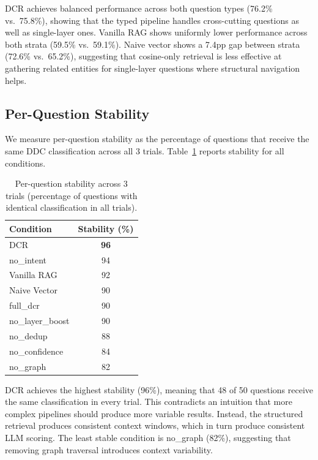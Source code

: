 \documentclass[11pt,a4paper]{article}
\begin{document}
DCR achieves balanced performance across both question types (76.2\% vs.\ 75.8\%), showing that the typed pipeline handles cross-cutting questions as well as single-layer ones. Vanilla RAG shows uniformly lower performance across both strata (59.5\% vs.\ 59.1\%). Naive vector shows a 7.4pp gap between strata (72.6\% vs.\ 65.2\%), suggesting that cosine-only retrieval is less effective at gathering related entities for single-layer questions where structural navigation helps.

\subsection{Per-Question Stability}
\label{sec:stability}

We measure per-question stability as the percentage of questions that receive the same DDC classification across all 3 trials. Table~\ref{tab:stability} reports stability for all conditions.

\begin{table}[t]
\centering
\caption{Per-question stability across 3 trials (percentage of questions with identical classification in all trials).}
\label{tab:stability}
\begin{tabular}{@{}lc@{}}
\toprule
Condition & Stability (\%) \\
\midrule
DCR & \textbf{96} \\
no\_intent & 94 \\
Vanilla RAG & 92 \\
Naive Vector & 90 \\
full\_dcr & 90 \\
no\_layer\_boost & 90 \\
no\_dedup & 88 \\
no\_confidence & 84 \\
no\_graph & 82 \\
\bottomrule
\end{tabular}
\end{table}

DCR achieves the highest stability (96\%), meaning that 48 of 50 questions receive the same classification in every trial. This contradicts an intuition that more complex pipelines should produce more variable results. Instead, the structured retrieval produces consistent context windows, which in turn produce consistent LLM scoring. The least stable condition is no\_graph (82\%), suggesting that removing graph traversal introduces context variability.

\end{document}
